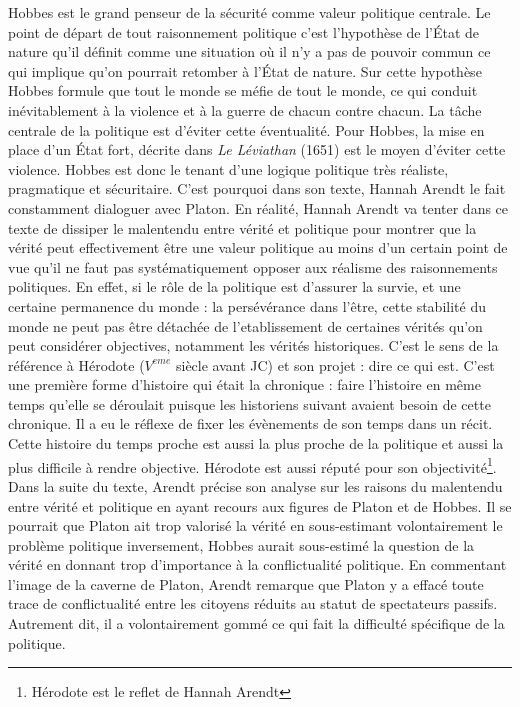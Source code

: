 \documentclass[12pt]{article}
\begin{document}
Hobbes est le grand penseur de la sécurité comme valeur politique centrale.
Le point de départ de tout raisonnement politique c'est l'hypothèse de l'État de nature qu'il définit comme une situation où il n'y a pas de pouvoir commun ce qui implique qu'on pourrait retomber à l'État de nature.
Sur cette hypothèse Hobbes formule que tout le monde se méfie de tout le monde, ce qui conduit inévitablement à la violence et à la guerre de chacun contre chacun.
La tâche centrale de la politique est d'éviter cette éventualité.
Pour Hobbes, la mise en place d'un État fort, décrite dans \emph{Le Léviathan} (1651) est le moyen d'éviter cette violence.
Hobbes est donc le tenant d'une logique politique très réaliste, pragmatique et sécuritaire.
C'est pourquoi dans son texte, Hannah Arendt le fait constamment dialoguer avec Platon.
En réalité, Hannah Arendt va tenter dans ce texte de dissiper le malentendu entre vérité et politique pour montrer que la vérité peut effectivement être une valeur politique au moins d'un certain point de vue qu'il ne faut pas systématiquement opposer aux réalisme des raisonnements politiques.
En effet, si le rôle de la politique est d'assurer la survie, et une certaine permanence du monde : la persévérance dans l'être, cette stabilité du monde ne peut pas être détachée de l'etablissement de certaines vérités qu'on peut considérer objectives, notamment les vérités historiques.
C'est le sens de la référence à Hérodote  ($V^{eme}$ siècle avant JC) et son projet : dire ce qui est.
C'est une première forme d'histoire qui était la chronique : faire l'histoire en même temps qu'elle se déroulait puisque les historiens suivant avaient besoin de cette chronique.
Il a eu le réflexe de fixer les évènements de son temps dans un récit.
Cette histoire du temps proche est aussi la plus proche de la politique et aussi la plus difficile à rendre objective.
Hérodote est aussi réputé pour son objectivité\footnote{Hérodote est le reflet de Hannah Arendt}.
Dans la suite du texte, Arendt précise son analyse sur les raisons du malentendu entre vérité et politique en ayant recours aux figures de Platon et de Hobbes.
Il se pourrait que Platon ait trop valorisé la vérité en sous-estimant volontairement le problème politique inversement, Hobbes aurait sous-estimé la question de la vérité en donnant trop d'importance à la conflictualité politique.
En commentant l'image de la caverne de Platon, Arendt remarque que Platon y a effacé toute trace de conflictualité entre les citoyens réduits au statut de spectateurs passifs.
Autrement dit, il a volontairement gommé ce qui fait la difficulté spécifique de la politique.
\end{document}

